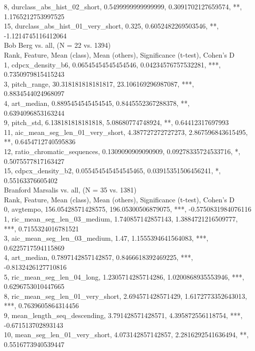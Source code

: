 8, durclass_abs_hist_02_short, 0.5499999999999999, 0.3091702127659574, **, 1.1765212753997525\\
15, durclass_abs_hist_01_very_short, 0.325, 0.6052482269503546, **, -1.1214745116412064\\
Bob Berg vs. all, (N = 22 vs. 1394)\\
Rank, Feature, Mean (class), Mean (others), Significance (t-test), Cohen's D\\
1, cdpcx_density_b6, 0.06545454545454546, 0.04234576757532281, ***, 0.7350979815415243\\
3, pitch_range, 30.318181818181817, 23.106169296987087, ***, 0.8834544024968097\\
4, art_median, 0.8895454545454545, 0.8445552367288378, **, 0.6394096853163244\\
9, pitch_std, 6.138181818181818, 5.08680774748924, **, 0.64412317697993\\
11, aic_mean_seg_len_01_very_short, 4.387727272727273, 2.867596843615495, **, 0.6454712740595836\\
12, ratio_chromatic_sequences, 0.1309090909090909, 0.09278335724533716, *, 0.5075577817163427\\
15, cdpcx_density_b2, 0.055454545454545465, 0.03915351506456241, *, 0.55163376605402\\
Branford Marsalis vs. all, (N = 35 vs. 1381)\\
Rank, Feature, Mean (class), Mean (others), Significance (t-test), Cohen's D\\
0, avgtempo, 156.05428571428575, 196.05300506879075, ***, -0.5750831984076116\\
1, ric_mean_seg_len_03_medium, 1.740857142857143, 1.3884721216509777, ***, 0.7155324016781521\\
3, aic_mean_seg_len_03_medium, 1.47, 1.1555394641564083, ***, 0.6225717594115869\\
4, art_median, 0.7897142857142857, 0.8466618392469225, ***, -0.8132426127710816\\
5, ric_mean_seg_len_04_long, 1.2305714285714286, 1.0200868935553946, ***, 0.6296753010447665\\
8, ric_mean_seg_len_01_very_short, 2.694571428571429, 1.6172773352643013, ***, 0.7639605864314456\\
9, mean_length_seq_descending, 3.791428571428571, 4.395872556118754, ***, -0.671513702893143\\
10, mean_seg_len_01_very_short, 4.073142857142857, 2.2816292541636494, **, 0.5516773940539447\\
